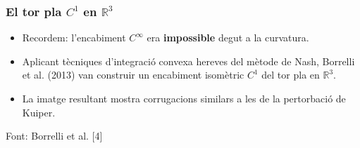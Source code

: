 \documentclass[aspectratio=169]{beamer}
\begin{document}
\begin{frame}
  \frametitle{El tor pla $C^1$ en $\mathbb{R}^3$}
  
  \begin{itemize}
    \item<1-> Recordem: l'encabiment $C^\infty$ era \textbf{impossible} degut a la curvatura. 
    \pause
    \item<2-> Aplicant tècniques d'integració convexa hereves del mètode de Nash, Borrelli et al. (2013) van construir un encabiment isomètric $C^1$ del tor pla en $\mathbb R^3$. 
    \pause
    \item<3-> La imatge resultant mostra corrugacions similars a les de la pertorbació de Kuiper.
  \end{itemize}
  
  \centering
  \tiny{Font: Borrelli et al. [4]}
\end{frame}
\end{document}
